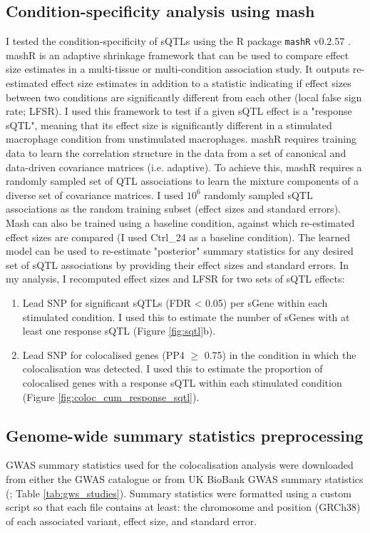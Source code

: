 \subsection{Condition-specificity analysis using mash}
\label{sec:mash_methods}
I tested the condition-specificity of sQTLs using the R package \Verb+mashR+ v0.2.57 \cite{Urbut2019-gf}. mashR is an adaptive shrinkage framework that can be used to compare effect size estimates in a multi-tissue or multi-condition association study. It outputs re-estimated effect size estimates in addition to a statistic indicating if effect sizes between two conditions are significantly different from each other (local false sign rate; LFSR). I used this framework to test if a given sQTL effect is a "response sQTL", meaning that its effect size is significantly different in a stimulated macrophage condition from unstimulated macrophages. mashR requires training data to learn the correlation structure in the data from a set of canonical and data-driven covariance matrices (i.e. adaptive). To achieve this, mashR requires a randomly sampled set of QTL associations to learn the mixture components of a diverse set of covariance matrices. I used $10^6$ randomly sampled sQTL associations as the random training subset (effect sizes and standard errors). Mash can also be trained using a baseline condition, against which re-estimated effect sizes are compared (I used Ctrl\_24 as a baseline condition). The learned model can be used to re-estimate "posterior" summary statistics for any desired set of sQTL associations by providing their effect sizes and standard errors. In my analysis, I recomputed effect sizes and LFSR for two sets of sQTL effects: 
\begin{enumerate}
\item Lead SNP for significant sQTLs (FDR < 0.05) per sGene within each stimulated condition. I used this to estimate the number of sGenes with at least one response sQTL (Figure \ref{fig:sqtl}b).
\item Lead SNP for colocalised genes (PP4 $\geq$ 0.75) in the condition in which the colocalisation was detected. I used this to estimate the proportion of colocalised genes with a response sQTL within each stimulated condition (Figure \ref{fig:coloc_cum_response_sqtl}). 
\end{enumerate}
\subsection{Genome-wide summary statistics preprocessing}
GWAS summary statistics used for the colocalisation analysis were downloaded from either the GWAS catalogue \cite{Buniello2019-wb} or from UK BioBank GWAS summary statistics (\cite{Zhou2018-jh}; Table \ref{tab:gws_studies}). Summary statistics were formatted using a custom script so that each file contains at least: the chromosome and position (GRCh38) of each associated variant, effect size, and standard error. 

